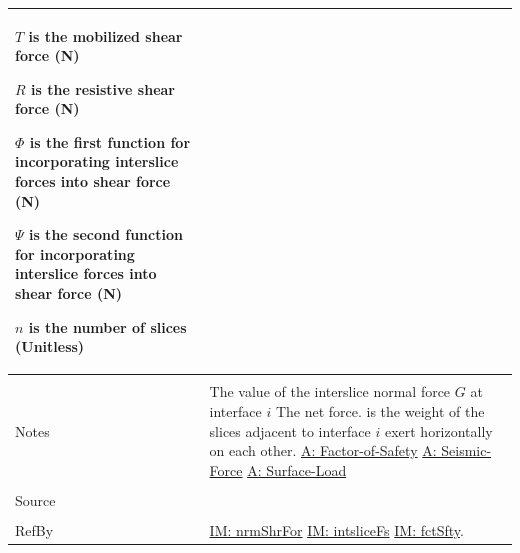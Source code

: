 \documentclass[12pt]{article}
\begin{document}
\begin{minipage}{\textwidth}
\begin{tabular}{p{} p{}}
\begin{symbDescription}
                                                                                           \item{$T$ is the mobilized shear force (N)}
                                                                                           \item{$R$ is the resistive shear force (N)}
                                                                                           \item{$Φ$ is the first function for incorporating interslice forces into shear force (N)}
                                                                                           \item{$Ψ$ is the second function for incorporating interslice forces into shear force (N)}
                                                                                           \item{$n$ is the number of slices (Unitless)}
                                                                                           \end{symbDescription}
                                                                                           \\ \midrule \\
                                                                                           Notes & The value of the interslice normal force $G$ at interface $i$ The net force. is the weight of the slices adjacent to interface $i$ exert horizontally on each other. \hyperref[A:Factor-of-Safety]{A: Factor-of-Safety} \hyperref[A:Seismic-Force]{A: Seismic-Force} \hyperref[A:Surface-Load]{A: Surface-Load}
                                                                                                   \\ \midrule \\
                                                                                                   Source & \cite{chen2005}
                                                                                                            \\ \midrule \\
                                                                                                            RefBy & \hyperref[IM:nrmShrFor]{IM: nrmShrFor} \hyperref[IM:intsliceFs]{IM: intsliceFs} \hyperref[IM:fctSfty]{IM: fctSfty}.
\\ \bottomrule \end{tabular}
\end{minipage}
\end{document}
